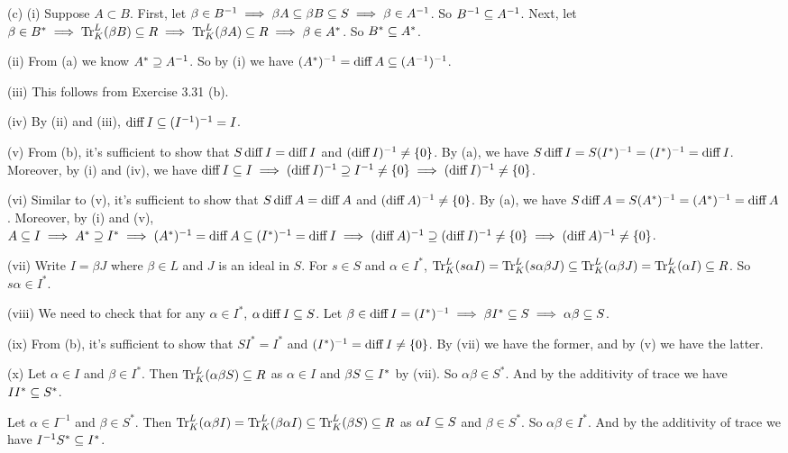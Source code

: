 \documentclass[../Marcus.tex]{subfiles}
\begin{document}
(c) (i) Suppose $A\subset B$. First, let $\beta \in B^{-1} \implies \beta A \subseteq \beta B \subseteq S \implies \beta \in A^{-1}$. So $B^{-1} \subseteq A^{-1}$. Next, let $\beta \in B^* \implies \operatorname{Tr}^L_K(\beta B) \subseteq R \implies \operatorname{Tr}^L_K(\beta A) \subseteq R \implies \beta \in A^*$. So $B^* \subseteq A^*$.

(ii) From (a) we know $A^* \supseteq A^{-1}$. So by (i) we have $(A^*)^{-1} = \operatorname{diff} A \subseteq (A^{-1})^{-1}$.

(iii) This follows from Exercise 3.31 (b).

(iv) By (ii) and (iii), $\operatorname{diff} I \subseteq (I^{-1})^{-1} = I$.

(v) From (b), it's sufficient to show that $S\operatorname{diff} I = \operatorname{diff} I$ and $(\operatorname{diff} I)^{-1} \neq \{0\}$. By (a), we have $S \operatorname{diff} I = S (I^*)^{-1} = (I^*)^{-1} = \operatorname{diff} I$. Moreover, by (i) and (iv), we have $\operatorname{diff} I \subseteq I \implies (\operatorname{diff} I)^{-1} \supseteq I^{-1} \neq \{0\} \implies (\operatorname{diff} I)^{-1} \neq \{0\}$.

(vi) Similar to (v), it's sufficient to show that $S\operatorname{diff} A = \operatorname{diff} A$ and $(\operatorname{diff} A)^{-1} \neq \{0\}$. By (a), we have $S \operatorname{diff} A = S (A^*)^{-1} = (A^*)^{-1} = \operatorname{diff} A$. Moreover, by (i) and (v), $A \subseteq I \implies A^* \supseteq I^* \implies (A^*)^{-1} = \operatorname{diff} A \subseteq (I^*)^{-1} = \operatorname{diff} I \implies (\operatorname{diff} A)^{-1} \supseteq (\operatorname{diff} I)^{-1} \neq \{0\} \implies (\operatorname{diff} A)^{-1} \neq \{0\}$.

(vii) Write $I=\beta J$ where $\beta \in L$ and $J$ is an ideal in $S$. For $s\in S$ and $\alpha \in I^*$, $\operatorname{Tr}^L_K(s\alpha I) = \operatorname{Tr}^L_K(s\alpha \beta J) \subseteq \operatorname{Tr}^L_K(\alpha\beta J) = \operatorname{Tr}^L_K(\alpha I) \subseteq R$. So $s\alpha \in I^*$.

(viii) We need to check that for any $\alpha \in I^*$, $\alpha \operatorname{diff} I \subseteq S$. Let $\beta \in\operatorname{diff} I = (I^*)^{-1} \implies \beta I^* \subseteq S \implies \alpha\beta \subseteq S$.

(ix) From (b), it's sufficient to show that $SI^* = I^*$ and $(I^*)^{-1} = \operatorname{diff} I \neq \{0\}$. By (vii) we have the former, and by (v) we have the latter.

(x) Let $\alpha \in I$ and $\beta \in I^*$. Then $\operatorname{Tr}^L_K(\alpha\beta S) \subseteq R$ as $\alpha \in I$ and $\beta S \subseteq I^*$ by (vii). So $\alpha\beta \in S^*$. And by the additivity of trace we have $II^* \subseteq S^*$.

Let $\alpha \in I^{-1}$ and $\beta \in S^*$. Then $\operatorname{Tr}^L_K(\alpha\beta I)  = \operatorname{Tr}^L_K(\beta\alpha I) \subseteq \operatorname{Tr}^L_K(\beta S) \subseteq R$ as $\alpha I \subseteq S$ and $\beta \in S^*$. So $\alpha\beta \in I^*$. And by the additivity of trace we have $I^{-1}S^* \subseteq I^*$.
\end{document}
